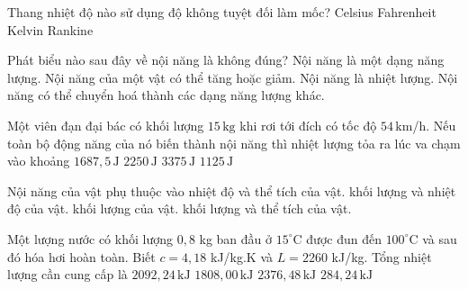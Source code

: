 \begin{ex}
Thang nhiệt độ nào sử dụng độ không tuyệt đối làm mốc?
\choice
{Celsius}
{Fahrenheit}
{\True Kelvin}
{Rankine}
\end{ex}

\begin{ex}
Phát biểu nào sau đây về nội năng là không đúng?
\choice
{Nội năng là một dạng năng lượng.}
{Nội năng của một vật có thể tăng hoặc giảm.}
{\True Nội năng là nhiệt lượng.}
{Nội năng có thể chuyển hoá thành các dạng năng lượng khác.}
\end{ex}

\begin{ex}Một viên đạn đại bác có khối lượng $15\,\mathrm{kg}$ khi rơi tới đích có tốc độ $54\,\mathrm{km}$/h. Nếu toàn bộ động năng của nó biến thành nội năng thì nhiệt lượng tỏa ra lúc va chạm vào khoảng
\choice
{\True $1687{,}5\,\mathrm{J}$}
{$2250\,\mathrm{J}$}
{$3375\,\mathrm{J}$}
{$1125\,\mathrm{J}$}
\end{ex}

\begin{ex}
Nội năng của vật phụ thuộc vào
\choice
{\True nhiệt độ và thể tích của vật.}
{khối lượng và nhiệt độ của vật.}
{khối lượng của vật.}
{khối lượng và thể tích của vật.}
\end{ex}

\begin{ex}Một lượng nước có khối lượng $0,8$ kg ban đầu ở $15^\circ\mathrm{C}$ được đun đến $100^\circ\mathrm{C}$ và sau đó hóa hơi hoàn toàn. Biết $c=4,18$ kJ/kg.K và $L=2260$ kJ/kg. Tổng nhiệt lượng cần cung cấp là
\choice
{\True $2092,24\,\mathrm{kJ}$}
{$1808,00\,\mathrm{kJ}$}
{$2376,48\,\mathrm{kJ}$}
{$284,24\,\mathrm{kJ}$}
\end{ex}

